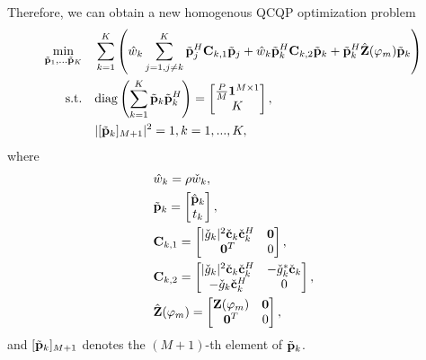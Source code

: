 Therefore, we can obtain a new homogenous QCQP optimization problem
\begin{subequations} \label{problem:shared_homogeneous_qcqp}
    \begin{align} 
        \min_{\tilde{\bf p}_1,...\tilde{\bf p}_K} \quad & \sum_{k=1}^K \left(\hat{w}_k\sum_{j=1,j \neq k}^K \tilde{\bf p}_j^H {\bf C}_{k,1}\tilde{\bf p}_j + \hat{w}_k\tilde{\bf p}_k^H {\bf C}_{k,2} \tilde{\bf p}_k + \tilde{\bf p}_k^H \hat{\bf Z}(\varphi_m) \tilde{\bf p}_k \right) 
        \\ \mathrm{s.t.} \quad & \mathrm{diag} \left( \sum_{k=1}^K \tilde{\bf p}_k \tilde{\bf p}_k^H \right) = \begin{bmatrix} \frac{P}{M} {\bf 1}^{M \times 1} \\ K\end{bmatrix}, 
        \\ &|[\tilde{\bf p}_k]_{M+1}|^2 =1, k=1,...,K, 
    \end{align}
\end{subequations}
where 
\begin{align} 
    & \hat{w}_k = \rho \check{w}_k,
    \\ & \tilde{\bf p}_k = \begin{bmatrix} \hat{\bf p}_k \\ t_k\end{bmatrix},
    \\ & {\bf C}_{k,1} = \begin{bmatrix} |\check{g}_k|^2 \check{\bf c}_k \check{\bf c}_k^H & {\bf 0} \\ {\bf 0}^T & 0 \end{bmatrix},
    \\ & {\bf C}_{k,2} = \begin{bmatrix} |\check{g}_k|^2 \check{\bf c}_k \check{\bf c}_k^H & -\check{g}_k^* \check{\bf c}_k \\ -\check{g}_k \check{\bf c}_k^H & 0 \end{bmatrix}, 
    \\ &\hat{\bf Z}(\varphi_m) = \begin{bmatrix} {\bf Z}(\varphi_m) & {\bf 0} \\ {\bf 0}^T & 0 \end{bmatrix},
\end{align}
and $[\tilde{\bf p}_k]_{M+1}$ denotes the $(M+1)$-th element of $\tilde{\bf p}_k$.

